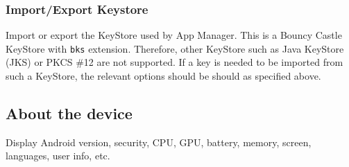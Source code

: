 \subsubsection{Import/Export Keystore}\label{subsubsec:import/export-keystore} %
Import or export the KeyStore used by App Manager. This is a Bouncy Castle KeyStore with \texttt{bks} extension.
Therefore, other KeyStore such as Java KeyStore (JKS) or PKCS \#12 are not supported.
If a key is needed to be imported from such a KeyStore, the relevant options should be should as specified above.


\subsection{About the device}\label{subsec:device-info} %
Display Android version, security, CPU, GPU, battery, memory, screen, languages, user info, etc.
